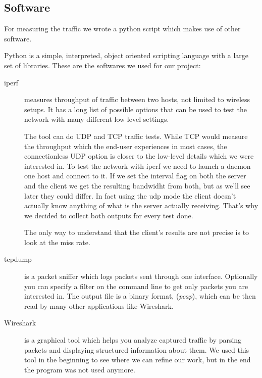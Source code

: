 \subsection{Software} \label{setup:software}



\noindent
For measuring the traffic we wrote a python script which makes use of other software.

Python is a simple, interpreted, object oriented scripting language with a large set of libraries.
These are the softwares we used for our project:

\begin{description}
	\item[iperf]
		measures throughput of traffic between two hosts, not limited to wireless setups.
It has a long list of possible options that can be used to test the network with many different low level settings.

The tool can do UDP and TCP traffic tests.\newline
While TCP would measure the throughput which the end-user experiences in most cases, the connectionless UDP option is closer to the low-level details which we were interested in.
To test the network with iperf we need to launch a daemon one host and connect to it.\newline
If we set the interval flag on both the server and the client we get the resulting bandwidht from both, but as we'll see later they could differ.\newline
In fact using the udp mode the client doesn't actually know anything of what is the server actually receiving.
That's why we decided to collect both outputs for every test done.

The only way to understand that the client's results are not precise is to look at the miss rate.

	\item[tcpdump]
		is a packet sniffer which logs packets sent through one interface. Optionally you can specify a filter on the command line to get only packets you are interested in.
The output file is a binary format, ({\em pcap}), which can be then read by many other applications like Wireshark.
		
	\item[Wireshark]
		is a graphical tool which helps you analyze captured traffic by parsing packets and displaying structured information about them.
		We used this tool in the beginning to see where we can refine our work, but in the end the program was not used anymore.


\end{description}
